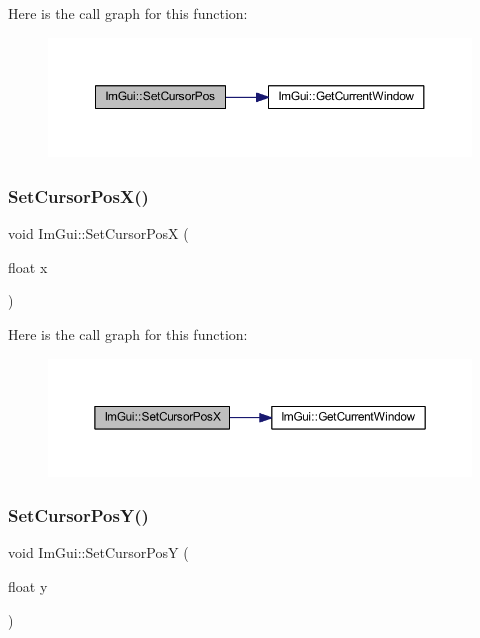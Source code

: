 Here is the call graph for this function\+:
\nopagebreak
\begin{figure}[H]
\begin{center}
\leavevmode
\includegraphics[width=350pt]{namespace_im_gui_a51ea13c986360d8a2e868dc9eeac2115_cgraph}
\end{center}
\end{figure}
\mbox{\label{namespace_im_gui_a8f56616f8d0b35e6e756c0b7f198ac0f}} 
\subsubsection{\texorpdfstring{Set\+Cursor\+Pos\+X()}{SetCursorPosX()}}
{\footnotesize\ttfamily void Im\+Gui\+::\+Set\+Cursor\+PosX (\begin{DoxyParamCaption}\item[{float}]{x }\end{DoxyParamCaption})}

Here is the call graph for this function\+:
\nopagebreak
\begin{figure}[H]
\begin{center}
\leavevmode
\includegraphics[width=350pt]{namespace_im_gui_a8f56616f8d0b35e6e756c0b7f198ac0f_cgraph}
\end{center}
\end{figure}
\mbox{\label{namespace_im_gui_a0174d351957d5c5677ebc214dd54f499}} 
\subsubsection{\texorpdfstring{Set\+Cursor\+Pos\+Y()}{SetCursorPosY()}}
{\footnotesize\ttfamily void Im\+Gui\+::\+Set\+Cursor\+PosY (\begin{DoxyParamCaption}\item[{float}]{y }\end{DoxyParamCaption})}

